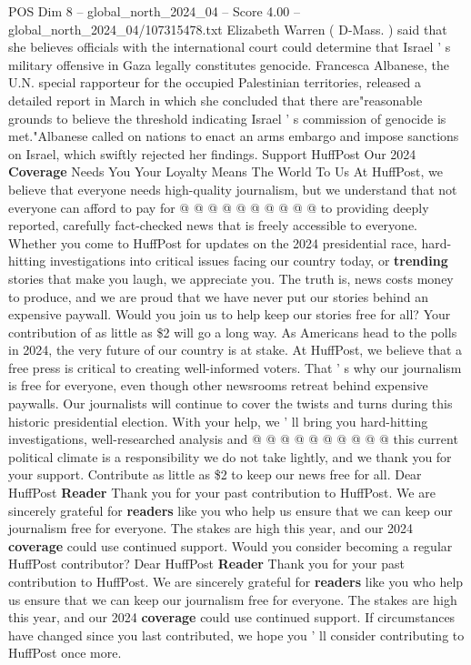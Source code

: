 \begin{textsample}{POS Dim 8 – global\_north\_2024\_04 – Score 4.00 – global\_north\_2024\_04/107315478.txt}
Elizabeth Warren ( D-Mass. ) said that she believes officials with the international court could determine that Israel ' s military offensive in Gaza legally constitutes genocide.
Francesca Albanese, the U.N. special rapporteur for the occupied Palestinian territories, released a detailed report in March in which she concluded that there are"reasonable grounds to believe the threshold indicating Israel ' s commission of genocide is met."Albanese called on nations to enact an arms embargo and impose sanctions on Israel, which swiftly rejected her findings.
Support HuffPost Our 2024 \textbf{Coverage} Needs You Your Loyalty Means The World To Us At HuffPost, we believe that everyone needs high-quality journalism, but we understand that not everyone can afford to pay for @ @ @ @ @ @ @ @ @ @ to providing deeply reported, carefully fact-checked news that is freely accessible to everyone.
Whether you come to HuffPost for updates on the 2024 presidential race, hard-hitting investigations into critical issues facing our country today, or \textbf{trending} stories that make you laugh, we appreciate you.
The truth is, news costs money to produce, and we are proud that we have never put our stories behind an expensive paywall.
Would you join us to help keep our stories free for all?
Your contribution of as little as \$2 will go a long way.
As Americans head to the polls in 2024, the very future of our country is at stake.
At HuffPost, we believe that a free press is critical to creating well-informed voters.
That ' s why our journalism is free for everyone, even though other newsrooms retreat behind expensive paywalls.
Our journalists will continue to cover the twists and turns during this historic presidential election.
With your help, we ' ll bring you hard-hitting investigations, well-researched analysis and @ @ @ @ @ @ @ @ @ @ this current political climate is a responsibility we do not take lightly, and we thank you for your support.
Contribute as little as \$2 to keep our news free for all.
Dear HuffPost \textbf{Reader} Thank you for your past contribution to HuffPost.
We are sincerely grateful for \textbf{readers} like you who help us ensure that we can keep our journalism free for everyone.
The stakes are high this year, and our 2024 \textbf{coverage} could use continued support.
Would you consider becoming a regular HuffPost contributor?
Dear HuffPost \textbf{Reader} Thank you for your past contribution to HuffPost.
We are sincerely grateful for \textbf{readers} like you who help us ensure that we can keep our journalism free for everyone.
The stakes are high this year, and our 2024 \textbf{coverage} could use continued support.
If circumstances have changed since you last contributed, we hope you ' ll consider contributing to HuffPost once more.

\end{textsample}

